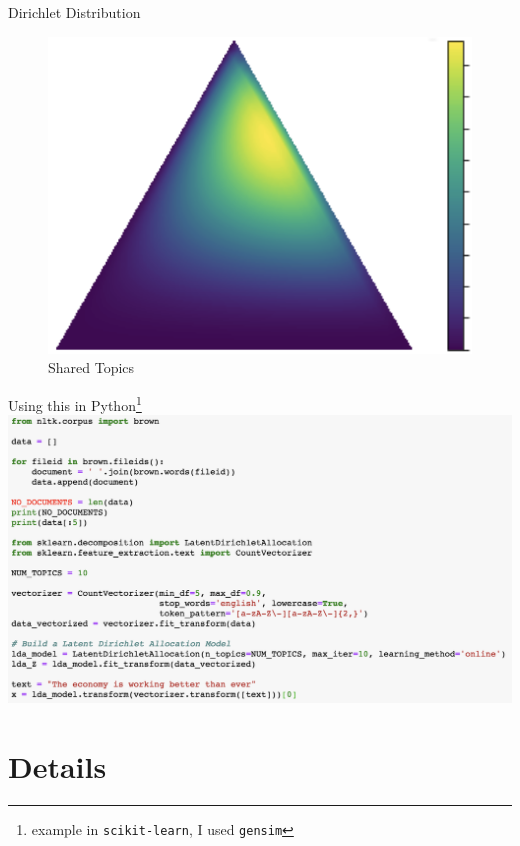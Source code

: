 \documentclass[10pt]{beamer}
\begin{document}
\begin{frame}{Dirichlet Distribution}
\begin{multicols}{3}
    \columnbreak

  \hfill
    \begin{figure}
  \includegraphics[width=\columnwidth]{shared.png}
  \caption{Shared Topics}
  \end{figure}

  \end{multicols}

\end{frame}

\begin{frame}{Using this in Python\footnote{example in \texttt{scikit-learn}, I used \texttt{gensim}}}
  \includegraphics[width=\textwidth]{./implement.png}
\end{frame}



\section{Details}
\end{document}
